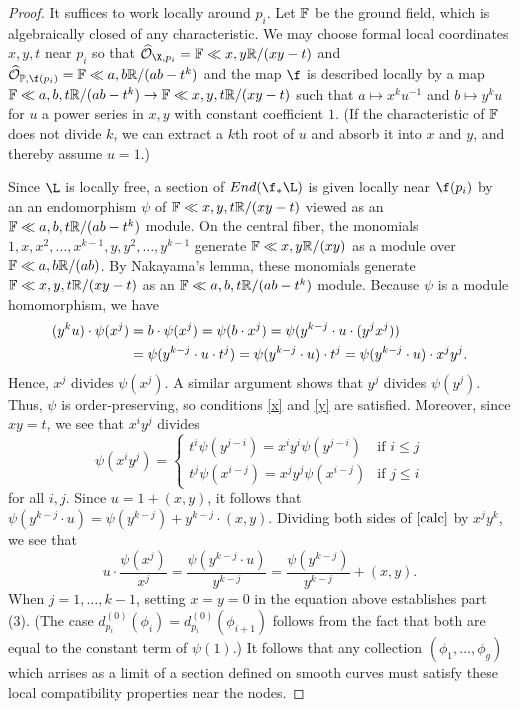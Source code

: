  \begin{proof}
 It suffices to work locally around $p_i$.
 Let $\mathbb{F}$ be the ground field, which is algebraically closed of any characteristic.
 We may choose formal local coordinates $x, y, t$ near $p_i$ so that $\widehat{\O}_{\X, p_i} = \cc\ll x, y \rr /(xy - t)$ and $\widehat{\O}_{\P, \f(p_i)} = \cc\ll a, b \rr /(ab - t^k)$ and the map $\f$ is described locally by a map $\mathbb{F}\ll a, b, t \mathbb{R} /(ab - t^k) \rightarrow \mathbb{F}\ll x, y, t \mathbb{R}/(xy - t)$ such that $a \mapsto x^k u^{-1}$ and $b \mapsto y^k u$ for $u$ a power series in $x, y$ with constant coefficient $1$. (If the characteristic of $\mathbb{F}$ does not divide $k$, we can extract a $k$th root of $u$ and absorb it into $x$ and $y$, and thereby assume $u  = 1$.)

 Since $\L$ is locally free, a section of $End(\f_*\L)$ is given locally near $\f(p_i)$ by an an endomorphism $\psi$ of $\mathbb{F}\ll x, y, t \mathbb{R}/(xy - t)$ viewed as an $\mathbb{F}\ll a, b, t \mathbb{R} /(ab - t^k) $ module.
On the central fiber, the monomials $1, x, x^2, \ldots, x^{k-1}, y, y^2, \ldots, y^{k-1}$ generate $\mathbb{F}\ll x, y \mathbb{R}/(xy)$ as a module over $\mathbb{F}\ll a, b \mathbb{R} /(ab)$. By Nakayama's lemma, these monomials generate $\mathbb{F}\ll x, y, t \mathbb{R}/(xy - t)$ as an $\mathbb{F} \ll a, b, t \mathbb{R} /(ab - t^k)$ module. Because $\psi$ is a module homomorphism, we have
 \begin{align}
  (y^ku) \cdot \psi(x^j) &= b \cdot \psi(x^j) = \psi(b \cdot x^j) = \psi(y^{k-j} \cdot u \cdot (y^jx^j)) \notag \\
  &= \psi(y^{k-j} \cdot u \cdot t^j) = \psi(y^{k-j} \cdot u) \cdot t^j = \psi(y^{k-j} \cdot u) \cdot x^jy^j. \label{calc}\dcref{3.4}
\source{refined-brill-noether-theory-hurwitz-spaces}
  \end{align}
Hence, $x^j$ divides $\psi(x^j)$. A similar argument shows that $y^{j}$ divides $\psi(y^{j})$. Thus, $\psi$ is order-preserving, so conditions \eqref{x} and \eqref{y} are satisfied.
Moreover, since $xy = t$, we see that $x^iy^j$ divides
\[\psi(x^i y^j) = \begin{cases} t^{i} \psi(y^{j -i})  =  x^{i} y^i \psi(y^{j -i}) & \text{if $i \leq j$} \\ t^j \psi(x^{i - j}) =  x^jy^j \psi(x^{i - j}) &\text{if $j \leq i$} \end{cases}\]
for all $i, j$. Since $u = 1 + (x, y)$, it follows that $\psi(y^{k-j} \cdot u) = \psi(y^{k-j}) + y^{k-j} \cdot (x, y)$.
Dividing both sides of $\eqref{calc}$ by $x^j y^{k}$, we see that
 \[u \cdot \frac{\psi(x^j)}{x^j} = \frac{\psi(y^{k-j} \cdot u)}{y^{k-j}} = \frac{\psi(y^{k-j})}{y^{k-j}} + (x, y).\]
When $j = 1 , \ldots, k-1$, setting $x = y = 0$ in the equation above establishes part (3). (The case $d^{(0)}_{p_i}(\phi_i) = d_{p_i}^{(0)}(\phi_{i+1})$ follows from the fact that both are equal to the constant term of $\psi(1)$.)
It follows that any collection $(\phi_1, \ldots, \phi_g)$ which arrises as a limit of a section defined on smooth curves must satisfy these local compatibility properties near the nodes.
   \end{proof}

